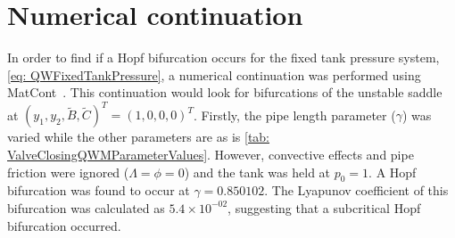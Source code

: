 \chapter{Numerical continuation} \label{sec: Continuation}

In order to find if a Hopf bifurcation occurs for the fixed tank pressure system, \cref{eq: QWFixedTankPressure}, a numerical continuation was performed using MatCont~\cite{Dhooge2003MATCONT}. This continuation would look for bifurcations of the unstable saddle at $(y_1,y_2,\tilde{B},\tilde{C})^T = (1,0,0,0)^T$. Firstly, the pipe length parameter ($\gamma$) was varied while the other parameters are as is \cref{tab: ValveClosingQWMParameterValues}. However, convective effects and pipe friction were ignored ($\Lambda = \phi = 0$) and the tank was held at $p_0 = 1$. A Hopf bifurcation was found to occur at $\gamma = 0.850102$. The Lyapunov coefficient of this bifurcation was calculated as  $5.4 \times 10^{-02}$, suggesting that a subcritical Hopf bifurcation occurred.


